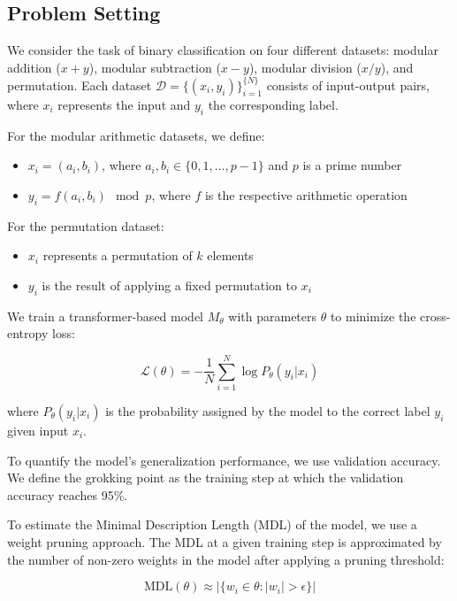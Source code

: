 \documentclass{article} %
\begin{document}
\subsection{Problem Setting}

We consider the task of binary classification on four different datasets: modular addition ($x+y$), modular subtraction ($x-y$), modular division ($x/y$), and permutation. Each dataset $\mathcal{D} = \{(x_i, y_i)\}_{i=1}^{\{N\}}$ consists of input-output pairs, where $x_i$ represents the input and $y_i$ the corresponding label.

For the modular arithmetic datasets, we define:
\begin{itemize}
    \item $x_i = (a_i, b_i)$, where $a_i, b_i \in \{0, 1, \ldots, p-1\}$ and $p$ is a prime number
    \item $y_i = f(a_i, b_i) \mod p$, where $f$ is the respective arithmetic operation
\end{itemize}

For the permutation dataset:
\begin{itemize}
    \item $x_i$ represents a permutation of $k$ elements
    \item $y_i$ is the result of applying a fixed permutation to $x_i$
\end{itemize}

We train a transformer-based model $M_\theta$ with parameters $\theta$ to minimize the cross-entropy loss:

\begin{equation}
    \mathcal{L}(\theta) = -\frac{1}{N} \sum_{i=1}^N \log P_\theta(y_i|x_i)
\end{equation}

where $P_\theta(y_i|x_i)$ is the probability assigned by the model to the correct label $y_i$ given input $x_i$.

To quantify the model's generalization performance, we use validation accuracy. We define the grokking point as the training step at which the validation accuracy reaches 95\%.

To estimate the Minimal Description Length (MDL) of the model, we use a weight pruning approach. The MDL at a given training step is approximated by the number of non-zero weights in the model after applying a pruning threshold:

\begin{equation}
    \text{MDL}(\theta) \approx |\{w_i \in \theta : |w_i| > \epsilon\}|
\end{equation}
\end{document}

